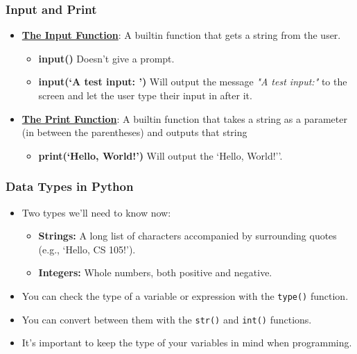 \documentclass{beamer}
\begin{document}
\begin{frame}
  \frametitle{Input and Print}
  \begin{itemize}
    \item \underline{\textbf{The Input Function}}: A builtin function that gets a string from the user.
      \pause
      \begin{itemize}
        \item \textbf{input()} \textrightarrow Doesn't give a prompt.
          \pause
        \item \textbf{input(`A test input: ')} \textrightarrow Will output the message \textit{"A test input:"} to the screen and let the user type their input in after it.
          \pause
      \end{itemize}
    \item \underline{\textbf{The Print Function}}: A builtin function that takes a string as a parameter (in between the parentheses) and outputs that string
      \pause
      \begin{itemize}
        \item \textbf{print(`Hello, World!')} \textrightarrow Will output the `Hello, World!''. 
      \end{itemize}
  \end{itemize}
\end{frame}

%
%
\begin{frame}
  \frametitle{Data Types in Python}
  \begin{itemize}
    \item Two types we'll need to know now:
      \begin{itemize}
        \item \textbf{Strings: } A long list of characters accompanied by surrounding quotes (e.g., `Hello, CS 105!').
        \item \textbf{Integers: } Whole numbers, both positive and negative.
      \end{itemize}
    \item You can check the type of a variable or expression with the \lstinline{type()} function.
      \pause
    \item You can convert between them with the \lstinline{str()} and \lstinline{int()} functions.
      \pause
    \item It's important to keep the type of your variables in mind when programming.
      \pause
  \end{itemize}
\end{frame}
\end{document}
